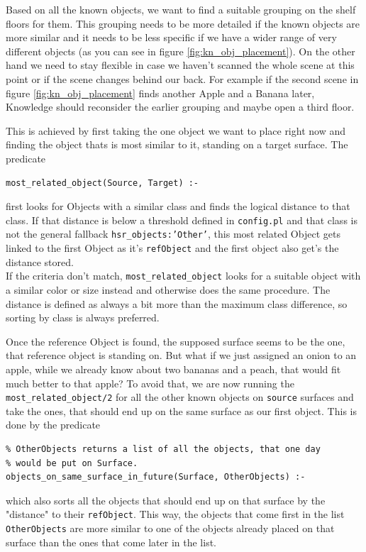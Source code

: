 \documentclass[main.tex]{subfiles}
\begin{document}
Based on all the known objects, we want to find a suitable grouping on the shelf floors for them. This grouping needs to be more detailed if the known objects are more similar and it needs to be less specific if we have a wider range of very different objects (as you can see in figure \ref{fig:kn_obj_placement}). On the other hand we need to stay flexible in case we haven't scanned the whole scene at this point or if the scene changes behind our back. For example if the second scene in figure \ref{fig:kn_obj_placement} finds another Apple and a Banana later, Knowledge should reconsider the earlier grouping and maybe open a third floor.

This is achieved by first taking the one object we want to place right now and finding the object thats is most similar to it, standing on a target surface. The predicate
\begin{lstlisting}
most_related_object(Source, Target) :-
\end{lstlisting}
first looks for Objects with a similar class and finds the logical distance to that class. If that distance is below a threshold defined in \texttt{config.pl} and that class is not the general fallback \texttt{hsr\_objects:'Other'}, this most related Object gets linked to the first Object as it's \texttt{refObject} and the first object also get's the distance stored.\\
If the criteria don't match, \texttt{most\_related\_object} looks for a suitable object with a similar color or size instead and otherwise does the same procedure. The distance is defined as always a bit more than the maximum class difference, so sorting by class is always preferred.

Once the reference Object is found, the supposed surface seems to be the one, that reference object is standing on. But what if we just assigned an onion to an apple, while we already know about two bananas and a peach, that would fit much better to that apple? To avoid that, we are now running the \texttt{most\_related\_object/2} for all the other known objects on \texttt{source} surfaces and take the ones, that should end up on the same surface as our first object. This is done by the predicate
\begin{lstlisting}
% OtherObjects returns a list of all the objects, that one day 
% would be put on Surface.
objects_on_same_surface_in_future(Surface, OtherObjects) :-
\end{lstlisting}
which also sorts all the objects that should end up on that surface by the "distance" to their \texttt{refObject}. This way, the objects that come first in the list \texttt{OtherObjects} are more similar to one of the objects already placed on that surface than the ones that come later in the list.
\end{document}
